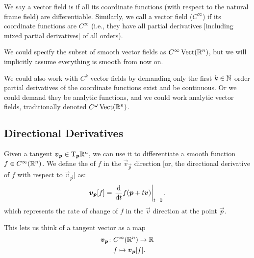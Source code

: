 \begin{definition}
We say a vector field is  if all its coordinate
functions (with respect to the natural frame field) are differentiable.
Similarly, we call a vector field  ($C^{\infty}$) if its
coordinate functions are $C^{\infty}$ (i.e., they have all partial
derivatives [including mixed partial derivatives] of all orders).
\end{definition}

\begin{remark}
We could specify the subset of smooth vector fields as
$C^{\infty}\operatorname{Vect}(\mathbb{R}^{n})$, but we will implicitly assume everything is
smooth from now on.
\end{remark}

\begin{remark}
We could also work with $C^{k}$ vector fields by demanding only the
first $k\in\mathbb{N}$ order partial derivatives of the coordinate functions
exist and be continuous. Or we could demand they be analytic functions,
and we could work analytic vector fields, traditionally denoted
$C^{\omega}\operatorname{Vect}(\mathbb{R}^{n})$. 
\end{remark}

\subsection{Directional Derivatives}

\begin{definition}\label{defn:over-r-n:directional-derivative-relative-to-tangent-vector}
Given a tangent $\boldsymbol{v}_{\boldsymbol{p}}\in\mathrm{T}_{\boldsymbol{p}}\mathbb{R}^{n}$, we can
use it to differentiate a smooth function $f\in C^{\infty}(\mathbb{R}^{n})$.
We define the  of $f$ in the $\vec{v}_{\vec{p}}$
direction [or, the directional derivative of $f$ with respect to $\vec{v}_{\vec{p}}$]
as:
\begin{equation}
  \boldsymbol{v}_{\boldsymbol{p}}[f] =\left.
  \frac{\mathrm{d}}{\mathrm{d} t}f(\boldsymbol{p} + t\boldsymbol{v})\right|_{t=0},
\end{equation}
which represents the rate of change of $f$ in the $\vec{v}$ direction at
the point $\vec{p}$.
\end{definition}

\begin{remark}
This lets us think of a tangent vector as a map
\begin{equation}
  \begin{split}
    \boldsymbol{v}_{\boldsymbol{p}}\colon & C^{\infty}(\mathbb{R}^{n})\to\mathbb{R}\\
                           & f\mapsto \boldsymbol{v}_{\boldsymbol{p}}[f].
  \end{split}
\end{equation}
\end{remark}

